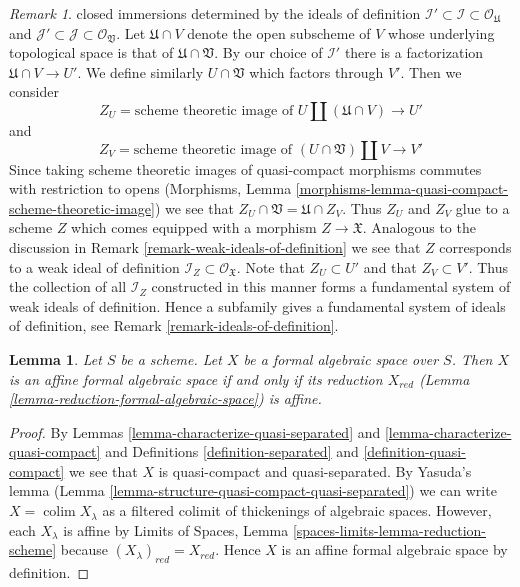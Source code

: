 \documentclass{stacks-project}
\theoremstyle{plain}
\newtheorem{lemma}[subsection]{Lemma}
\theoremstyle{definition}
\theoremstyle{remark}
\newtheorem{remark}[subsection]{Remark}
\numberwithin{equation}{subsection}
\def\colim{\mathop{\mathrm{colim}}\nolimits}
\begin{document}
\begin{remark}
closed immersions determined by the ideals of definition
$\mathcal{I}' \subset \mathcal{I} \subset \mathcal{O}_\mathfrak U$
and
$\mathcal{J}' \subset \mathcal{J} \subset \mathcal{O}_\mathfrak V$.
Let $\mathfrak U \cap V$ denote the open subscheme of $V$ whose
underlying topological space is that of $\mathfrak U \cap \mathfrak V$.
By our choice of $\mathcal{I}'$ there is a factorization
$\mathfrak U \cap V \to U'$.
We define similarly $U \cap \mathfrak V$ which factors through $V'$.
Then we consider
$$
Z_U = \text{scheme theoretic image of }
U \amalg (\mathfrak U \cap V) \longrightarrow U'
$$
and
$$
Z_V = \text{scheme theoretic image of }
(U \cap \mathfrak V) \amalg V \longrightarrow V'
$$
Since taking scheme theoretic images of quasi-compact morphisms
commutes with restriction to opens (Morphisms, Lemma
\ref{morphisms-lemma-quasi-compact-scheme-theoretic-image})
we see that $Z_U \cap \mathfrak V = \mathfrak U \cap Z_V$.
Thus $Z_U$ and $Z_V$ glue to a scheme $Z$ which comes equipped
with a morphism $Z \to \mathfrak X$. Analogous to the discussion in
Remark \ref{remark-weak-ideals-of-definition}
we see that $Z$ corresponds to a weak ideal
of definition $\mathcal{I}_Z \subset \mathcal{O}_\mathfrak X$.
Note that $Z_U \subset U'$ and that
$Z_V \subset V'$. Thus the collection of all $\mathcal{I}_Z$
constructed in this manner forms a fundamental system of weak
ideals of definition. Hence a subfamily gives a fundamental system of ideals
of definition, see Remark \ref{remark-ideals-of-definition}.
\end{remark}

\begin{lemma}
\label{lemma-characterize-affine}
Let $S$ be a scheme. Let $X$ be a formal algebraic space over $S$.
Then $X$ is an affine formal algebraic space if and only if
its reduction $X_{red}$ (Lemma \ref{lemma-reduction-formal-algebraic-space})
is affine.
\end{lemma}

\begin{proof}
By Lemmas \ref{lemma-characterize-quasi-separated} and
\ref{lemma-characterize-quasi-compact} and
Definitions \ref{definition-separated} and \ref{definition-quasi-compact}
we see that $X$ is quasi-compact and quasi-separated.
By Yasuda's lemma (Lemma \ref{lemma-structure-quasi-compact-quasi-separated})
we can write $X = \colim X_\lambda$ as a filtered colimit
of thickenings of algebraic spaces. However, each $X_\lambda$
is affine by Limits of Spaces, Lemma
\ref{spaces-limits-lemma-reduction-scheme}
because $(X_\lambda)_{red} = X_{red}$.
Hence $X$ is an affine formal algebraic space by definition.
\end{proof}
\end{document}
